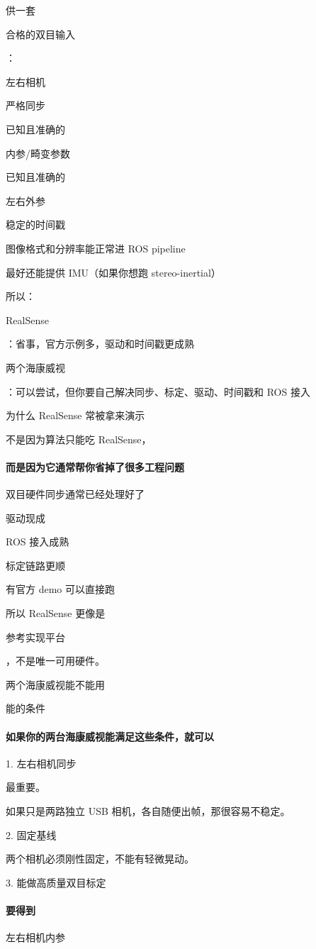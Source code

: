 \documentclass[12pt]{article}
\begin{document}
供一套

合格的双目输入

：

左右相机

严格同步

已知且准确的

内参/畸变参数

已知且准确的

左右外参

稳定的时间戳

图像格式和分辨率能正常进 ROS pipeline

最好还能提供 IMU（如果你想跑 stereo-inertial）

所以：

RealSense

：省事，官方示例多，驱动和时间戳更成熟

两个海康威视

：可以尝试，但你要自己解决同步、标定、驱动、时间戳和 ROS 接入

为什么 RealSense 常被拿来演示

不是因为算法只能吃 RealSense，

\paragraph{而是因为它通常帮你省掉了很多工程问题}
双目硬件同步通常已经处理好了

驱动现成

ROS 接入成熟

标定链路更顺

有官方 demo 可以直接跑

所以 RealSense 更像是

参考实现平台

，不是唯一可用硬件。

两个海康威视能不能用

能的条件

\paragraph{如果你的两台海康威视能满足这些条件，就可以}
1. 左右相机同步

最重要。

如果只是两路独立 USB 相机，各自随便出帧，那很容易不稳定。

2. 固定基线

两个相机必须刚性固定，不能有轻微晃动。

3. 能做高质量双目标定

\paragraph{要得到}
左右相机内参
\end{document}
